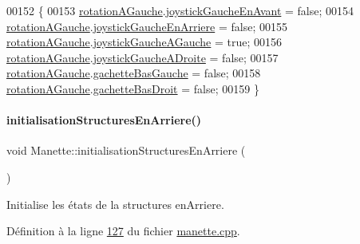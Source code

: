 \begin{DoxyCode}
00152 \{
00153     \hyperlink{class_manette_a3aa7b857df1a364d70f1626f2f517056}{rotationAGauche}.\hyperlink{struct_etat_manette_deplacement_a8c8e3ca694408bc6a6ced4e20b9da0be}{joystickGaucheEnAvant} = \textcolor{keyword}{false};
00154     \hyperlink{class_manette_a3aa7b857df1a364d70f1626f2f517056}{rotationAGauche}.\hyperlink{struct_etat_manette_deplacement_a584cf1538425c87588c5b96b79c8d482}{joystickGaucheEnArriere} = \textcolor{keyword}{false};
00155     \hyperlink{class_manette_a3aa7b857df1a364d70f1626f2f517056}{rotationAGauche}.\hyperlink{struct_etat_manette_deplacement_af7e92a8d8f116e2bc4a5a95386f604e7}{joystickGaucheAGauche} = \textcolor{keyword}{true};
00156     \hyperlink{class_manette_a3aa7b857df1a364d70f1626f2f517056}{rotationAGauche}.\hyperlink{struct_etat_manette_deplacement_a8fa93da5af430ac00ffd4ee8b76987a2}{joystickGaucheADroite} = \textcolor{keyword}{false};
00157     \hyperlink{class_manette_a3aa7b857df1a364d70f1626f2f517056}{rotationAGauche}.\hyperlink{struct_etat_manette_deplacement_a0d197e25bc2e0402a068a8d012c25472}{gachetteBasGauche} = \textcolor{keyword}{false};
00158     \hyperlink{class_manette_a3aa7b857df1a364d70f1626f2f517056}{rotationAGauche}.\hyperlink{struct_etat_manette_deplacement_a4588620c1e2a3543ce67c9a791aac106}{gachetteBasDroit} = \textcolor{keyword}{false};
00159 \}
\end{DoxyCode}
\mbox{\label{class_manette_ae4379b4f09192b83219de5aaa548fda0}} 
\paragraph{\texorpdfstring{initialisation\+Structures\+En\+Arriere()}{initialisationStructuresEnArriere()}}
{\footnotesize\ttfamily void Manette\+::initialisation\+Structures\+En\+Arriere (\begin{DoxyParamCaption}{ }\end{DoxyParamCaption})\hspace{0.3cm}{\ttfamily [private]}}



Initialise les états de la structures en\+Arriere. 



Définition à la ligne \hyperlink{manette_8cpp_source_l00127}{127} du fichier \hyperlink{manette_8cpp_source}{manette.\+cpp}.




